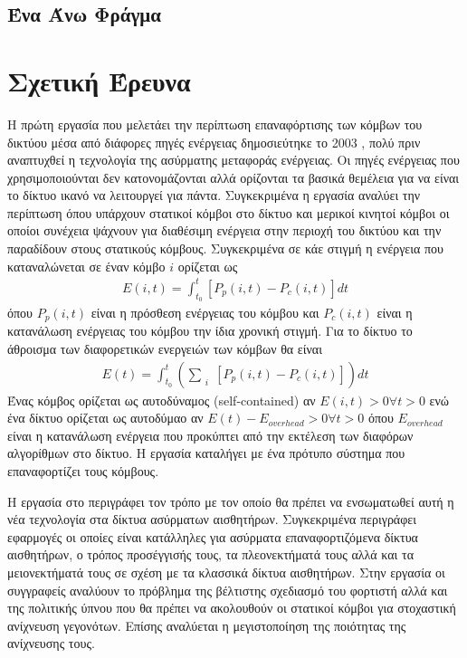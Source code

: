 \subsection{Ένα Άνω Φράγμα}

\section{Σχετική Έρευνα}
Η πρώτη εργασία που μελετάει την περίπτωση επαναφόρτισης των κόμβων του δικτύου μέσα από διάφορες πηγές ενέργειας δημοσιεύτηκε το 2003 \cite{estrin_recharge}, πολύ
πριν αναπτυχθεί η τεχνολογία της ασύρματης μεταφοράς ενέργειας. Οι πηγές ενέργειας που χρησιμοποιούνται δεν κατονομάζονται αλλά ορίζονται τα βασικά θεμέλεια για να
είναι το δίκτυο ικανό να λειτουργεί για πάντα. Συγκεκριμένα η εργασία αναλύει την περίπτωση όπου υπάρχουν στατικοί κόμβοι στο δίκτυο και μερικοί κινητοί κόμβοι οι
οποίοι συνέχεια ψάχνουν για διαθέσιμη ενέργεια στην περιοχή του δικτύου και την παραδίδουν στους στατικούς κόμβους.
Συγκεκριμένα σε κάε στιγμή η ενέργεια που καταναλώνεται σε έναν κόμβο $i$ ορίζεται ως
\begin{align*}
E(i,t)=\int^{t}_{t_{0}}[P_{p}(i,t)-P_{c}(i,t)]dt
\end{align*}
όπου $P_{p}(i,t)$ είναι η πρόσθεση ενέργειας του κόμβου και $P_{c}(i,t)$ είναι η κατανάλωση ενέργειας του κόμβου την ίδια χρονική στιγμή. Για το δίκτυο το άθροισμα
των διαφορετικών ενεργειών των κόμβων θα είναι
\begin{align*}
E(t)=\int^{t}_{t_{0}}(\sum\limits_{\substack{i}}[P_{p}(i,t)-P_{c}(i,t)])dt
\end{align*}
Ένας κόμβος ορίζεται ως αυτοδύναμος (self-contained) αν $E(i,t)>0 \forall t>0$ ενώ ένα δίκτυο ορίζεται ως αυτοδύμαο αν $E(t)-E_{overhead}>0\forall t>0$ όπου 
$E_{overhead}$ είναι η κατανάλωση ενέργεια που προκύπτει από την εκτέλεση των διαφόρων αλγορίθμων στο δίκτυο. Η εργασία καταλήγει με ένα πρότυπο σύστημα που
επαναφορτίζει τους κόμβους.

Η εργασία στο \cite{smart_dust_revisited} περιγράφει τον τρόπο με τον οποίο θα πρέπει να ενσωματωθεί αυτή η νέα τεχνολογία στα δίκτυα ασύρματων αισθητήρων.
Συγκεκριμένα περιγράφει εφαρμογές οι οποίες είναι κατάλληλες για ασύρματα επαναφορτιζόμενα δίκτυα αισθητήρων, ο τρόπος προσέγγισής τους, τα πλεονεκτήματά τους αλλά
και τα μειονεκτήματά τους σε σχέση με τα κλασσικά δίκτυα αισθητήρων. Στην εργασία \cite{optimal_scheduling} οι συγγραφείς αναλύουν το πρόβλημα της βέλτιστης
σχεδιασμό του φορτιστή αλλά και της πολιτικής ύπνου που θα πρέπει να ακολουθούν οι στατικοί κόμβοι για στοχαστική ανίχνευση γεγονότων. Επίσης αναλύεται η
μεγιστοποίηση της ποιότητας της ανίχνευσης τους.

